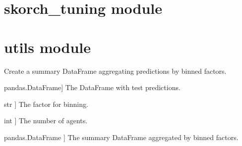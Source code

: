 \documentclass[letterpaper,10pt,english]{sphinxmanual}
\begin{document}
\sphinxstepscope


\section{skorch\_tuning module}
\label{\detokenize{skorch_tuning:module-skorch_tuning}}\label{\detokenize{skorch_tuning:skorch-tuning-module}}\label{\detokenize{skorch_tuning::doc}}

\begin{fulllineitems}
\label{\detokenize{skorch_tuning:skorch_tuning.main}}
\pysigstartsignatures
{}
\pysigstopsignatures
\end{fulllineitems}


\sphinxstepscope


\section{utils module}
\label{\detokenize{utils:module-utils}}\label{\detokenize{utils:utils-module}}\label{\detokenize{utils::doc}}

\begin{fulllineitems}
\label{\detokenize{utils:utils.create_df_sum}}
\pysigstartsignatures
{}
\pysigstopsignatures
\sphinxAtStartPar
Create a summary DataFrame aggregating predictions by binned factors.
\begin{description}
\begin{description}
\sphinxlineitem{df\_test\_pred}{[}pandas.DataFrame{]}
\sphinxAtStartPar
The DataFrame with test predictions.

\sphinxlineitem{factor}{[}str {]}
\sphinxAtStartPar
The factor for binning.

\sphinxlineitem{NUM\_AGENTS}{[}int {]}
\sphinxAtStartPar
The number of agents.

\end{description}

\begin{description}
\sphinxlineitem{df\_sum}{[}pandas.DataFrame {]}
\sphinxAtStartPar
The summary DataFrame aggregated by binned factors.

\end{description}

\end{description}

\end{fulllineitems}
\end{document}
